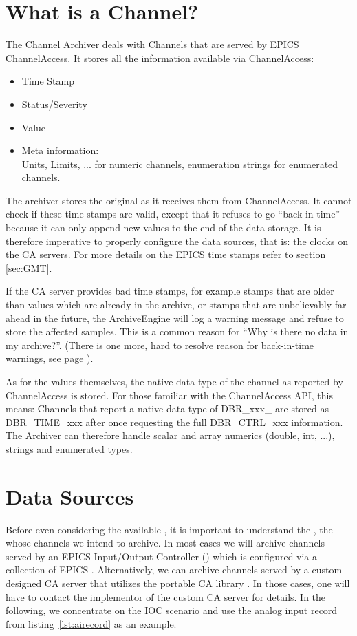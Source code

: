 \section{What is a Channel?} %
The Channel Archiver deals with Channels that are served by EPICS
ChannelAccess. It stores all the information available via ChannelAccess:
\begin{itemize}
\item Time Stamp
\item Status/Severity
\item Value
\item Meta information:\\
      Units, Limits, ... for numeric channels,
      enumeration strings for enumerated channels.
\end{itemize}

\noindent The archiver stores the original  as it receives
them from ChannelAccess. It cannot check if these time stamps are valid, except
that it refuses to go ``back in time'' because it can only append new
values to the end of the data storage. It is therefore imperative to
properly configure the data sources, that is: the clocks on the CA
servers. For more details on the EPICS time stamps refer to section
\ref{sec:GMT}.

\label{back:in:time}
\NOTE If the CA server provides bad time stamps, for example stamps
that are older than values which are already in the archive, or stamps
that are unbelievably far ahead in the future, the ArchiveEngine will log
a warning message and refuse to store the affected samples.
This is a common reason for ``Why is there no data in my archive?''.
(There is one more, hard to resolve reason for back-in-time warnings, see
page \pageref{sec:back-in-timefaq}).

As for the values themselves, the native data type of the channel as
reported by ChannelAccess is stored. For those familiar with the
ChannelAccess API, this means:
Channels that report a native data type of DBR\_xxx\_ are stored as
DBR\_TIME\_xxx after once requesting the full DBR\_CTRL\_xxx information.
 The Archiver can therefore handle scalar and array numerics
(double, int, ...), strings and enumerated types. 

\section{Data Sources} \label{sec:datasource} %
Before even considering the available , it is
important to understand the , the  whose channels we intend to archive.
In most cases we will archive channels served by an EPICS Input/Output
Controller () which is configured via a collection of EPICS
.
Alternatively, we can archive channels served by a custom-designed CA
server that utilizes the portable CA library .
In those cases, one will have to contact the implementor of the custom
CA server for details.
In the following, we concentrate on the IOC scenario and use the
analog input record from listing~\ref{lst:airecord} as an example.


